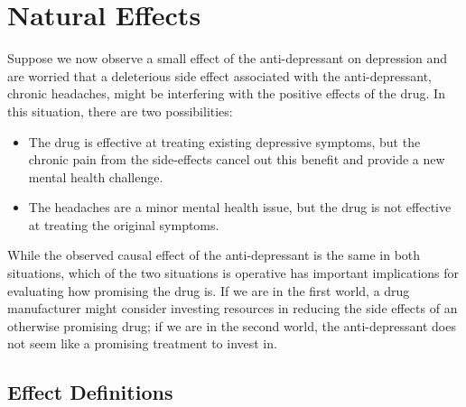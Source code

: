 \chapter{Natural Effects}

Suppose we now observe a small effect of the anti-depressant on depression and are worried 
that a deleterious side effect associated with the anti-depressant, chronic headaches, might be interfering 
with the positive effects of the drug. In this situation, there are two possibilities: 

\begin{itemize}[noitemsep,topsep=0pt]
	\item The drug is effective at treating existing depressive symptoms, but the chronic pain from the side-effects 
	cancel out this benefit and provide a new mental health challenge. 
	\item The headaches are a minor mental health issue, but the drug is not effective at treating the original 
	symptoms. 
\end{itemize}

While the observed causal effect of the anti-depressant is the same in both situations, which of the two situations is 
operative has important implications for evaluating how promising the drug is. If we are in the first world,
a drug manufacturer might consider investing resources in reducing the side effects of an otherwise promising drug;
if we are in the second world, the anti-depressant does not seem like a promising treatment to invest in. 


\section{Effect Definitions}\label{subsection:natural_effect_defs}

